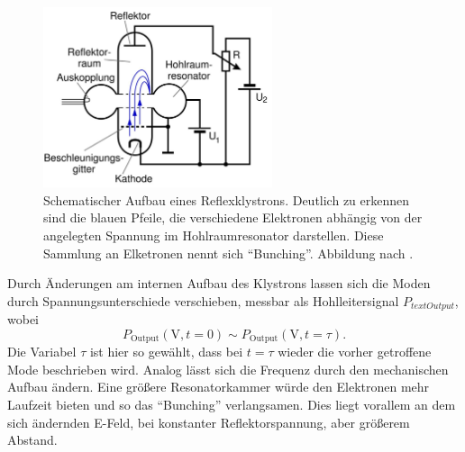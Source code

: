 \begin{figure}
    \centering
    \includegraphics[width=0.6\textwidth]{Bilder/theo.JPG}
    \caption{Schematischer Aufbau eines Reflexklystrons. Deutlich zu erkennen sind die blauen Pfeile, die verschiedene Elektronen abhängig von der angelegten Spannung im Hohlraumresonator darstellen. 
    Diese Sammlung an Elketronen nennt sich \enquote{Bunching}. Abbildung nach \cite{skript}.} 
    \label{fig:ref}
\end{figure}
Durch Änderungen am internen Aufbau des Klystrons lassen sich die Moden durch Spannungsunterschiede verschieben, messbar als Hohlleitersignal $P_{text{Output}}$, wobei
\begin{equation*}
    P_{\text{Output}} (\si{\volt}, t = 0) \sim P_{\text{Output}} (\si{\volt}, t = \tau).
\end{equation*}
Die Variabel $\tau$ ist hier so gewählt, dass bei $t = \tau$ wieder die vorher getroffene Mode beschrieben wird.
Analog lässt sich die Frequenz durch den mechanischen Aufbau ändern. Eine größere Resonatorkammer würde den Elektronen 
mehr Laufzeit bieten und so das \enquote{Bunching} verlangsamen. Dies liegt vorallem an dem sich ändernden E-Feld, bei konstanter Reflektorspannung, aber größerem
Abstand.

\newpage 

